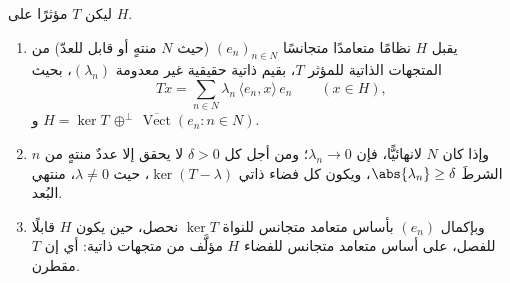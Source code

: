 \begin{theorem}\label{thm:b3:spectral:spectral}
ليكن $T$ مؤثرًا   على 
$H$.
\begin{enumerate}
  \item يقبل $H$ نظامًا متعامدًا متجانسًا $(e_n)_{n \in N}$ (حيث $N$
        منتهٍ أو قابل للعدّ) من المتجهات الذاتية للمؤثر $T$، بقيم
        ذاتية حقيقية غير معدومة $(\lambda_n)$، بحيث
        \[
        Tx = \sum_{n\in N}\lambda_n\,\langle e_n, x\rangle\,
        e_n \qquad (x \in H),
        \]
        و $H = \ker T \,\oplus^\perp\,
        \overline{\operatorname{Vect}}(e_n : n \in N)$.
  \item وإذا كان $N$ لانهائيًّا، فإن $\lambda_n \to 0$؛ ومن أجل كل
        $\delta > 0$ لا يحقق إلا عددٌ منتهٍ من $n$ الشرطَ
        $\abs{\lambda_n} \geq \delta$، ويكون كل فضاء ذاتي $\ker(T - \lambda)$، حيث
        $\lambda \neq 0$، منتهي البُعد.
  \item وبإكمال $(e_n)$ بأساس متعامد متجانس للنواة $\ker T$
        نحصل، حين يكون $H$ قابلًا للفصل، على أساس متعامد
        متجانس للفضاء $H$ مؤلَّف من متجهات ذاتية: أي إن $T$
        مقطرن.
\end{enumerate}
\end{theorem}

